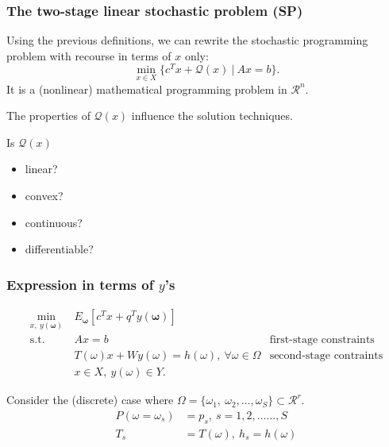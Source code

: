 \documentclass{beamer}
\def\bomega{\boldsymbol\omega}
\def\rit{\mathcal{R}}
\begin{document}
\begin{frame}
	\frametitle{The two-stage linear stochastic problem (SP)}
	
	Using the previous definitions, we can rewrite the stochastic programming problem with recourse in terms of $x$ only:
	\[
	\min_{x \in X} \lbrace c^T x + \mathcal{Q}(x) \ |\  Ax = b \rbrace.
	\]
	It is a (nonlinear) mathematical programming problem in $\rit^n$.
	
	The properties of $\mathcal{Q}(x)$ influence the solution techniques.
	
	\mbox{}
	
	Is $\mathcal{Q}(x)$
	\begin{itemize}
		\item
		linear?
		\item
		convex?
		\item
		continuous?
		\item
		differentiable?
	\end{itemize}
	
\end{frame}

\begin{frame}
	\frametitle{Expression in terms of $y$'s}
	
	\begin{align*}
	\min_{x,\ y(\bomega)}\ & E_{\bomega} [ c^T x +
	q^T y(\bomega) ] \\
	\mbox{s.t. } & Ax = b & \mbox{first-stage constraints} \\
	& T(\omega)x + Wy(\omega) = h(\omega),\ \forall \omega \in \Omega &
	\mbox{second-stage contraints} \\
	& x \in X,\ y(\omega) \in Y.
	\end{align*}
	
	Consider the (discrete) case where $\Omega = \lbrace \omega_1,\
	\omega_2,\ldots,\omega_S \rbrace \subset \rit^r$.
	\begin{align*}
	P(\omega = \omega_s) & = p_s,\ s = 1, 2,\ldots . . . , S \\
	T_s & = T (\omega),\ h_s = h(\omega) 
	\end{align*}
	
\end{frame}
\end{document}
